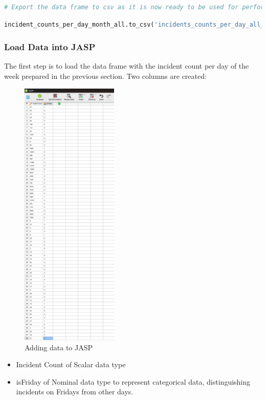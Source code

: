 \documentclass{article}
\begin{document}
\begin{lstlisting}[language=Python, breaklines=true]
# Export the data frame to csv as it is now ready to be used for performing statistical tests.
\end{lstlisting}


\begin{lstlisting}[language=Python, breaklines=true]
incident_counts_per_day_month_all.to_csv('incidents_counts_per_day_all_months.csv', encoding='utf-8', index=False)
\end{lstlisting}

\subsubsection{Load Data into JASP}

The first step is to load the data frame with the incident count per day of the week prepared in the previous section. Two columns are created:

\begin{figure}[H]
    \centering
    \includegraphics[width=0.5\linewidth, height=13cm]{Screenshot 2024-09-25 011255.png}
    \caption{Adding data to JASP}
    \label{fig:enter-label}
\end{figure}

\begin{itemize}
    \item Incident Count of Scalar data type
    \item isFriday of Nominal data type to represent categorical data, distinguishing incidents on Fridays from other days.
\end{itemize}
\end{document}
